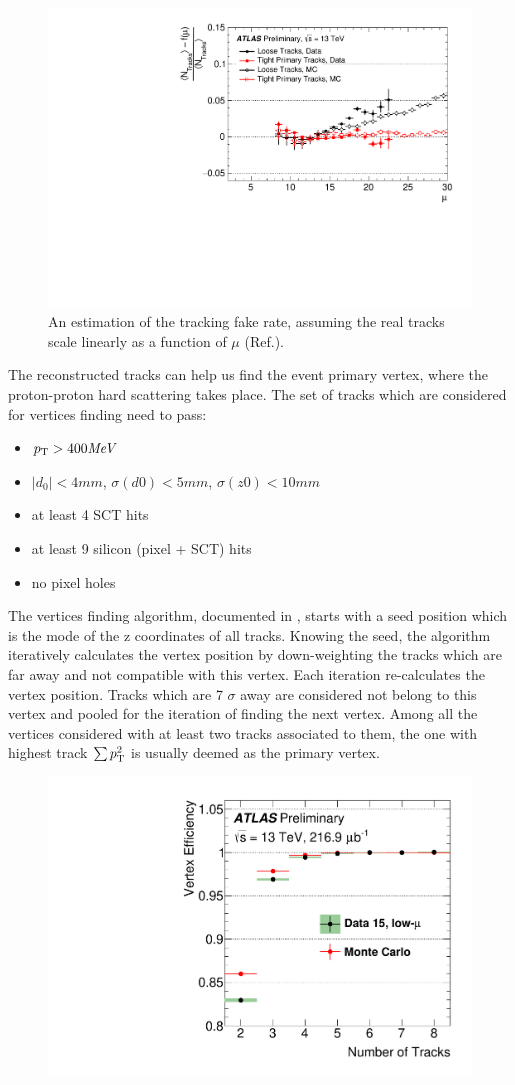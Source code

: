 \begin{figure}[htpb!]
\begin{center}
  \includegraphics[width=0.55\linewidth]{figures/Reco/TrackingFake}
\caption{An estimation of the tracking fake rate, assuming the real tracks scale linearly as a function of $\mu$ (Ref.\cite{ATL-PHYS-PUB-2015-051}). }
\label{fig:reco-trackingfake}
\end{center}
\end{figure}


The reconstructed tracks can help us find the event primary vertex, where the proton-proton hard scattering takes place. The set of tracks which are considered for vertices finding need to pass:

\begin{itemize}
\item $p_{{\rm T}} > 400 \textit{MeV}$
\item $|d_0|<4mm$, $\sigma(d0) < 5 mm$, $\sigma(z0) < 10 mm$
\item at least 4 SCT hits
\item at least 9 silicon (pixel + SCT) hits
\item no pixel holes
\end{itemize}

The vertices finding algorithm, documented in \cite{PERF-2015-01}, starts with a seed position which is the mode of the z coordinates of all tracks. Knowing the seed, the algorithm iteratively calculates the vertex position by down-weighting the tracks which are far away and not compatible with this vertex. Each iteration re-calculates the vertex position. Tracks which are 7 $\sigma$ away are considered not belong to this vertex and pooled for the iteration of finding the next vertex. Among all the vertices considered with at least two tracks associated to them, the one with highest track $\sum p_{{\rm T}}^2$ is usually deemed as the primary vertex.

\begin{figure}[htpb!]
\begin{center}
  \includegraphics[width=0.55\linewidth]{figures/Reco/TrackingVertex}
\caption{\cite{ATL-PHYS-PUB-2015-026}}
\label{fig:reco-primaryvertexeff}
\end{center}
\end{figure}


